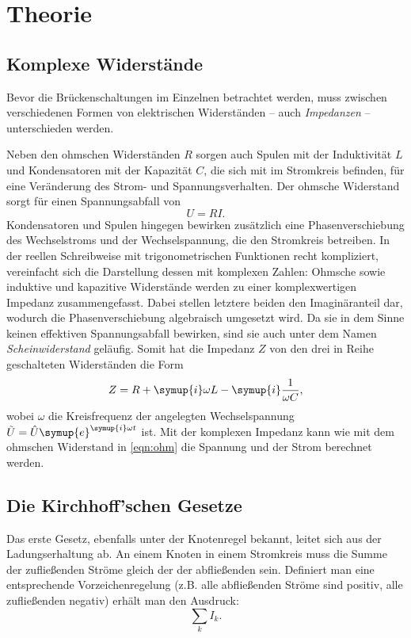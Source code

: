 \section{Theorie}
\label{sec:Theorie}
\subsection{Komplexe Widerstände}
Bevor die Brückenschaltungen im Einzelnen betrachtet werden, muss zwischen verschiedenen Formen von elektrischen Widerständen -- 
auch \textit{Impedanzen} -- unterschieden werden. 

Neben den ohmschen Widerständen $R$ sorgen auch Spulen mit der Induktivität $L$ und Kondensatoren mit der Kapazität $C$, 
die sich mit im Stromkreis befinden, für eine Veränderung des Strom- und Spannungsverhalten. 
Der ohmsche Widerstand sorgt für einen Spannungsabfall von 
\begin{equation}
    U=RI .
    \label{eqn:ohm}
\end{equation}
Kondensatoren und Spulen hingegen bewirken zusätzlich eine Phasenverschiebung des Wechselstroms und der Wechselspannung,
die den Stromkreis betreiben. 
In der reellen Schreibweise mit trigonometrischen Funktionen recht kompliziert, vereinfacht sich die Darstellung dessen 
mit komplexen Zahlen: 
Ohmsche sowie induktive und kapazitive Widerstände werden zu einer komplexwertigen Impedanz zusammengefasst. 
Dabei stellen letztere beiden den Imaginäranteil dar, wodurch die Phasenverschiebung algebraisch umgesetzt wird. 
Da sie in dem Sinne keinen effektiven Spannungsabfall bewirken, sind sie auch unter dem Namen \textit{Scheinwiderstand} geläufig.
Somit hat die Impedanz $Z$ von den drei in Reihe geschalteten Widerständen die Form 
\begin{equation}
    Z = R + \symup{i}\omega L - \symup{i}\frac{1}{\omega C} ,
    \label{eqn:impedanz}
\end{equation}
wobei $\omega$ die Kreisfrequenz der angelegten Wechselspannung $\tilde{U} = \hat{U} \symup{e}^{\symup{i}\omega t}$ ist.
Mit der komplexen Impedanz kann wie mit dem ohmschen Widerstand in \eqref{eqn:ohm} die Spannung und der Strom berechnet werden. 

\subsection{Die Kirchhoff'schen Gesetze}
Das erste Gesetz, ebenfalls unter der Knotenregel bekannt, leitet sich aus der Ladungserhaltung ab. 
An einem Knoten in einem Stromkreis muss die Summe der zufließenden Ströme gleich der der abfließenden sein. 
Definiert man eine entsprechende Vorzeichenregelung (z.B. alle abfließenden Ströme sind positiv, alle zufließenden negativ) 
erhält man den Ausdruck: 
\begin{equation}
    \sum_k I_k .
    \label{eqn:kirchhoff1}
\end{equation}

